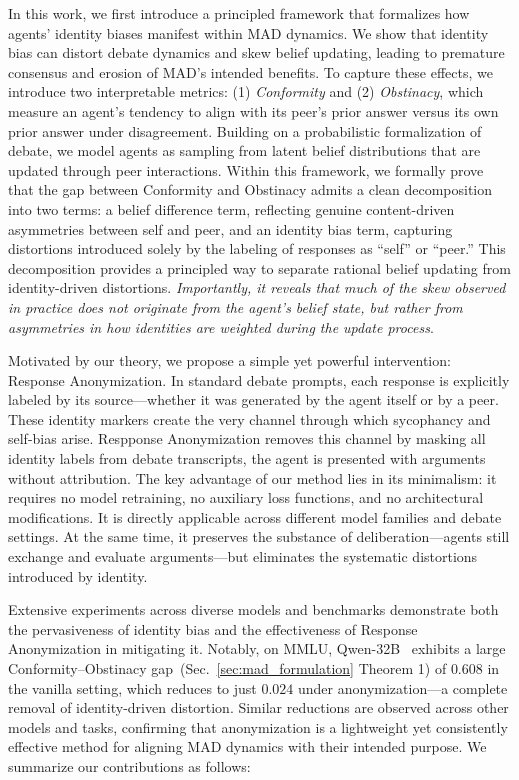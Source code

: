 \documentclass{article}
\begin{document}
In this work, we first introduce a principled framework that formalizes how agents’ identity biases manifest within MAD dynamics. We show that identity bias can distort debate dynamics and skew belief updating, leading to premature consensus and erosion of MAD’s intended benefits. To capture these effects, we introduce two interpretable metrics: (1) \emph{Conformity} and (2) \emph{Obstinacy}, which measure an agent’s tendency to align with its peer’s prior answer versus its own prior answer under disagreement. Building on a probabilistic formalization of debate, we model agents as sampling from latent belief distributions that are updated through peer interactions. Within this framework, we formally prove that the gap between Conformity and Obstinacy admits a clean decomposition into two terms: a {belief difference} term, reflecting genuine content-driven asymmetries between self and peer, and an {identity bias} term, capturing distortions introduced solely by the labeling of responses as “self” or “peer.” This decomposition provides a principled way to separate rational belief updating from identity-driven distortions. \emph{Importantly, it reveals that much of the skew observed in practice does not originate from the agent’s belief state, but rather from asymmetries in how identities are weighted during the update process}.


Motivated by our theory, we propose a simple yet powerful intervention: Response Anonymization. In standard debate prompts, each response is explicitly labeled by its source—whether it was generated by the agent itself or by a peer. These identity markers create the very channel through which sycophancy and self-bias arise.
Respponse Anonymization removes this channel by masking all identity labels from debate transcripts, the agent is presented with arguments without attribution. 
The key advantage of our method lies in its minimalism: it requires no model retraining, no auxiliary loss functions, and no architectural modifications. It is directly applicable across different model families and debate settings. At the same time, it preserves the substance of deliberation—agents still exchange and evaluate arguments—but eliminates the systematic distortions introduced by identity.


Extensive experiments across diverse models and benchmarks demonstrate both the pervasiveness of identity bias and the effectiveness of Response Anonymization in mitigating it. Notably, on MMLU, Qwen-32B~\citep{yang2024qwen2} exhibits a large Conformity–Obstinacy gap~(Sec.~\ref{sec:mad_formulation} Theorem 1) of $0.608$ in the vanilla setting, which reduces to just $0.024$ under anonymization---a complete removal of identity-driven distortion. Similar reductions are observed across other models and tasks, confirming that anonymization is a lightweight yet consistently effective method for aligning MAD dynamics with their intended purpose. We summarize our contributions as follows:
\end{document}

